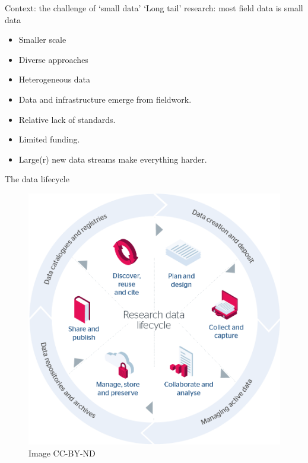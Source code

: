\begin{frame}{Context: the challenge of `small data'}
    `Long tail' research: most field data is small data \parencite{Borgman2015-rh}
    \begin{itemize}
        \item Smaller scale
        \item Diverse approaches
        \item Heterogeneous data
        \item Data and infrastructure emerge from fieldwork. 
        \item Relative lack of standards.
        \item Limited funding.
        \item Large(r) new data streams make everything harder.
    \end{itemize}
\end{frame}



\begin{frame}{The data lifecycle}
 \begin{figure}[H]
    \centering
    \vspace{-0.5cm}
        \includegraphics[height=.75\textheight]{figures/research-data-life-diagram.png}
        \caption{\cite{Jisc2018-gx} Image CC-BY-ND}
        \label{fig:figure9}
 \end{figure}
\end{frame}

